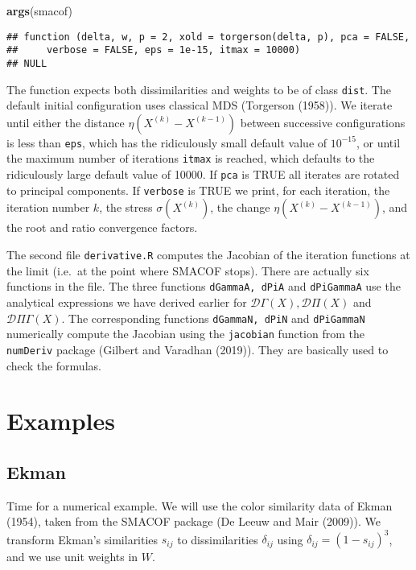 \documentclass[
  12pt,
]{article}
\newenvironment{Shaded}{\begin{snugshade}}{\end{snugshade}}
\newcommand{\FunctionTok}[1]{\textcolor[rgb]{0.13,0.29,0.53}{\textbf{#1}}}
\newcommand{\NormalTok}[1]{#1}
\begin{document}
\begin{Shaded}
\begin{Highlighting}[]
\FunctionTok{args}\NormalTok{(smacof)}
\end{Highlighting}
\end{Shaded}

\begin{verbatim}
## function (delta, w, p = 2, xold = torgerson(delta, p), pca = FALSE, 
##     verbose = FALSE, eps = 1e-15, itmax = 10000) 
## NULL
\end{verbatim}

The function expects both dissimilarities and weights to be of class \texttt{dist}. The default initial configuration uses classical MDS (Torgerson (1958)). We iterate until either the distance \(\eta(X^{(k)}-X^{(k-1)})\) between successive configurations is less than \texttt{eps}, which has the ridiculously small default value of \ensuremath{10^{-15}}, or until the maximum number of iterations \texttt{itmax} is reached, which defaults to the ridiculously large default value of 10000. If \texttt{pca} is TRUE all iterates are rotated to principal components. If \texttt{verbose} is TRUE we print, for each iteration, the iteration number \(k\), the stress \(\sigma(X^{(k)})\), the change \(\eta(X^{(k)}-X^{(k-1)})\), and the root and ratio convergence factors.

The second file \texttt{derivative.R} computes the Jacobian of the iteration functions at the limit (i.e.~at the point where SMACOF stops). There are actually six functions in the file. The three functions \texttt{dGammaA,\ dPiA} and \texttt{dPiGammaA} use the analytical expressions we have derived earlier for \(\mathcal{D}\Gamma(X), \mathcal{D}\Pi(X)\) and \(\mathcal{D}\Pi\Gamma(X).\) The corresponding functions \texttt{dGammaN,\ dPiN} and \texttt{dPiGammaN} numerically compute the Jacobian using the \texttt{jacobian} function from the \texttt{numDeriv} package (Gilbert and Varadhan (2019)). They are basically used to check the formulas.

\section{Examples}\label{examples}

\subsection{Ekman}\label{ekman}

Time for a numerical example. We will use the color similarity data of Ekman (1954), taken from the SMACOF package (De Leeuw and Mair (2009)).
We transform Ekman's similarities \(s_{ij}\) to dissimilarities \(\delta_{ij}\) using \(\delta_{ij}=(1-s_{ij})^3\), and we use unit weights in \(W\).
\end{document}

